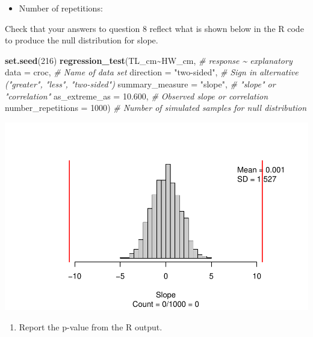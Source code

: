 \documentclass[
]{report}
\newenvironment{Shaded}{\begin{snugshade}}{\end{snugshade}}
\newcommand{\AttributeTok}[1]{\textcolor[rgb]{0.13,0.29,0.53}{#1}}
\newcommand{\CommentTok}[1]{\textcolor[rgb]{0.56,0.35,0.01}{\textit{#1}}}
\newcommand{\DecValTok}[1]{\textcolor[rgb]{0.00,0.00,0.81}{#1}}
\newcommand{\FloatTok}[1]{\textcolor[rgb]{0.00,0.00,0.81}{#1}}
\newcommand{\FunctionTok}[1]{\textcolor[rgb]{0.13,0.29,0.53}{\textbf{#1}}}
\newcommand{\NormalTok}[1]{#1}
\newcommand{\SpecialCharTok}[1]{\textcolor[rgb]{0.81,0.36,0.00}{\textbf{#1}}}
\newcommand{\StringTok}[1]{\textcolor[rgb]{0.31,0.60,0.02}{#1}}
\providecommand{\tightlist}{%
  \setlength{\itemsep}{0pt}\setlength{\parskip}{0pt}}
\begin{document}
\vspace{0.2in}

\begin{itemize}
\tightlist
\item
  Number of repetitions:
\end{itemize}

\vspace{.2in}

Check that your answers to question 8 reflect what is shown below in the R code to produce the null distribution for slope.

\begin{Shaded}
\begin{Highlighting}[]
\FunctionTok{set.seed}\NormalTok{(}\DecValTok{216}\NormalTok{)}
\FunctionTok{regression\_test}\NormalTok{(TL\_cm}\SpecialCharTok{\textasciitilde{}}\NormalTok{HW\_cm, }\CommentTok{\# response \textasciitilde{} explanatory}
               \AttributeTok{data =}\NormalTok{ croc, }\CommentTok{\# Name of data set}
               \AttributeTok{direction =} \StringTok{"two{-}sided"}\NormalTok{, }\CommentTok{\# Sign in alternative ("greater", "less", "two{-}sided")}
               \AttributeTok{summary\_measure =} \StringTok{"slope"}\NormalTok{, }\CommentTok{\# "slope" or "correlation"}
               \AttributeTok{as\_extreme\_as =} \FloatTok{10.600}\NormalTok{, }\CommentTok{\# Observed slope or correlation}
               \AttributeTok{number\_repetitions =} \DecValTok{1000}\NormalTok{) }\CommentTok{\# Number of simulated samples for null distribution}
\end{Highlighting}
\end{Shaded}

\begin{center}\includegraphics[width=0.7\linewidth]{13-OCA10-regression-simulation_files/figure-latex/unnamed-chunk-5-1} \end{center}

\begin{enumerate}
\def\labelenumi{\arabic{enumi}.}
\setcounter{enumi}{8}
\tightlist
\item
  Report the p-value from the R output.
\end{enumerate}
\end{document}
